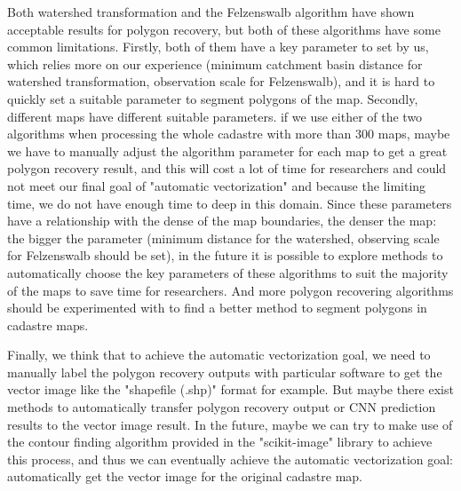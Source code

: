 \documentclass[12pt]{article}
\begin{document}
Both watershed transformation and the Felzenswalb algorithm have shown acceptable results for polygon recovery, but both of these algorithms have some common limitations. Firstly, both of them have a key parameter to set by us, which relies more on our experience (minimum catchment basin distance for watershed transformation, observation scale for Felzenswalb), and it is hard to quickly set a suitable parameter to segment polygons of the map. Secondly, different maps have different suitable parameters. if we use either of the two algorithms when processing the whole cadastre with more than 300 maps, maybe we have to manually adjust the algorithm parameter for each map to get a great polygon recovery result, and this will cost a lot of time for researchers and could not meet our final goal of "automatic vectorization" and because the limiting time, we do not have enough time to deep in this domain. Since these parameters have a relationship with the dense of the map boundaries, the denser the map: the bigger the parameter (minimum distance for the watershed, observing scale for Felzenswalb should be set), in the future it is possible to explore methods to automatically choose the key parameters of these algorithms to suit the majority of the maps to save time for researchers. And more polygon recovering algorithms should be experimented with to find a better method to segment polygons in cadastre maps.

Finally, we think that to achieve the automatic vectorization goal, we need to manually label the polygon recovery outputs with particular software to get the vector image like the "shapefile (.shp)" format for example.  But maybe there exist methods to automatically transfer polygon recovery output or CNN prediction results to the vector image result. In the future, maybe we can try to make use of the contour finding algorithm provided in the "scikit-image" library to achieve this process, and thus we can eventually achieve the automatic vectorization goal: automatically get the vector image for the original cadastre map.


\newpage








\clearpage

\end{document}
